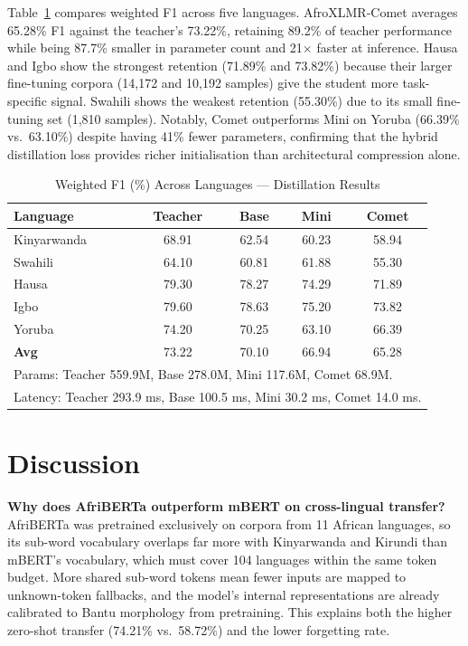 \documentclass[conference]{IEEEtran}
\begin{document}
Table~\ref{tab:distill} compares weighted F1 across five languages.
AfroXLMR-Comet averages 65.28\% F1 against the teacher's 73.22\%,
retaining 89.2\% of teacher performance while being 87.7\% smaller in
parameter count and 21$\times$ faster at inference.
Hausa and Igbo show the strongest retention (71.89\% and 73.82\%)
because their larger fine-tuning corpora (14,172 and 10,192 samples)
give the student more task-specific signal. Swahili shows the weakest
retention (55.30\%) due to its small fine-tuning set (1,810 samples).
Notably, Comet outperforms Mini on Yoruba (66.39\% vs.\ 63.10\%)
despite having 41\% fewer parameters, confirming that the hybrid
distillation loss provides richer initialisation than architectural
compression alone.

\begin{table}[htbp]
\caption{Weighted F1 (\%) Across Languages --- Distillation Results}
\label{tab:distill}
\begin{center}
\small
\begin{tabular}{lcccc}
\toprule
\textbf{Language} & \textbf{Teacher} & \textbf{Base} & \textbf{Mini} & \textbf{Comet} \\
\midrule
Kinyarwanda  & 68.91 & 62.54 & 60.23 & 58.94 \\
Swahili      & 64.10 & 60.81 & 61.88 & 55.30 \\
Hausa        & 79.30 & 78.27 & 74.29 & 71.89 \\
Igbo         & 79.60 & 78.63 & 75.20 & 73.82 \\
Yoruba       & 74.20 & 70.25 & 63.10 & 66.39 \\
\midrule
\textbf{Avg} & 73.22 & 70.10 & 66.94 & 65.28 \\
\bottomrule
\multicolumn{5}{l}{\small Params: Teacher 559.9M, Base 278.0M, Mini 117.6M, Comet 68.9M.} \\
\multicolumn{5}{l}{\small Latency: Teacher 293.9 ms, Base 100.5 ms, Mini 30.2 ms, Comet 14.0 ms.} \\
\end{tabular}
\end{center}
\end{table}

\section{Discussion}\label{sec:discussion}

\textbf{Why does AfriBERTa outperform mBERT on cross-lingual transfer?}
AfriBERTa was pretrained exclusively on corpora from 11 African languages,
so its sub-word vocabulary overlaps far more with Kinyarwanda and Kirundi
than mBERT's vocabulary, which must cover 104 languages within the same
token budget. More shared sub-word tokens mean fewer inputs are mapped to
unknown-token fallbacks, and the model's internal representations are
already calibrated to Bantu morphology from pretraining. This explains
both the higher zero-shot transfer (74.21\% vs.\ 58.72\%) and the lower
forgetting rate.
\end{document}
